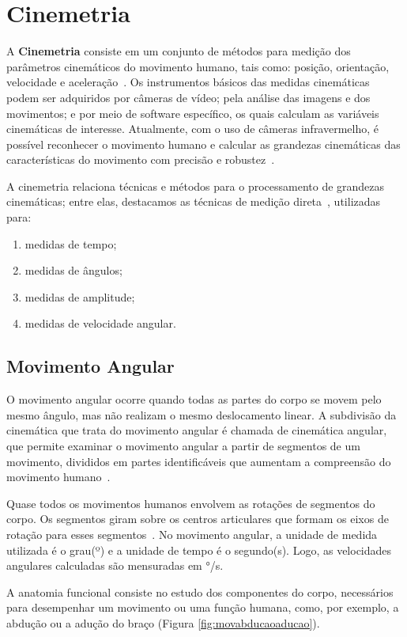 \section{Cinemetria}
A \textbf{Cinemetria} consiste em um conjunto de métodos para medição dos parâmetros cinemáticos do movimento humano, tais como: posição, orientação, velocidade e aceleração~\cite{mcginnis2013biomechanics}. Os instrumentos básicos das medidas cinemáticas podem ser adquiridos por câmeras de vídeo; pela análise das imagens e dos movimentos; e  por meio de software específico, os quais calculam as variáveis cinemáticas de interesse. Atualmente, com o uso de câmeras infravermelho, é possível reconhecer o movimento humano e calcular as grandezas cinemáticas das características do movimento com precisão e robustez~\cite{gabel2012}.

A cinemetria relaciona técnicas e métodos para o processamento de grandezas cinemáticas; entre elas, destacamos as técnicas de medição direta~\cite{mcginnis2013biomechanics}, utilizadas para: 
\begin{enumerate}
	\item medidas de tempo;
	\item medidas de ângulos;
	\item medidas de amplitude;
	\item medidas de velocidade angular.
\end{enumerate}

\subsection{Movimento Angular}
O movimento angular ocorre quando todas as partes do corpo se movem pelo mesmo ângulo, mas não realizam o mesmo deslocamento linear. A subdivisão da cinemática que trata do movimento angular é chamada de cinemática angular, que permite examinar o movimento angular a partir de segmentos de um movimento, divididos em partes identificáveis que aumentam a compreensão do movimento humano~\cite{hamill1999bases}. 

Quase todos os movimentos humanos envolvem as rotações de segmentos do corpo. Os segmentos giram sobre os centros articulares que formam os eixos de rotação para esses segmentos~\cite{hamill1999bases}. No movimento angular, a unidade de medida utilizada é o grau(º) e a unidade de tempo é o segundo(s). Logo, as velocidades angulares calculadas são mensuradas em °/s.

A anatomia funcional consiste no estudo dos componentes do corpo, necessários para desempenhar um movimento ou uma função humana, como, por exemplo, a abdução ou a adução do braço (Figura \ref{fig:movabducaoaducao}).

